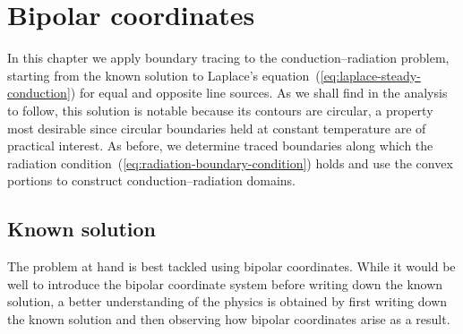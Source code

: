 \chapter{Bipolar coordinates}
\label{ch:bipolar}

In this chapter
we apply boundary tracing to the conduction--radiation problem,
starting from the known solution
to Laplace's equation~(\ref{eq:laplace-steady-conduction})
for equal and opposite line sources.
As we shall find in the analysis to follow,
this solution is notable because its contours are circular,
a property most desirable
since circular boundaries held at constant temperature
are of practical interest.
As before,
we determine traced boundaries along which
the radiation condition~(\ref{eq:radiation-boundary-condition}) holds
and use the convex portions to construct conduction--radiation domains.

\section{Known solution}
\label{sec:bipolar.known}

The problem at hand is best tackled using bipolar coordinates.
While it would be well to introduce the bipolar coordinate system
before writing down the known solution,
a better understanding of the physics is obtained
by first writing down the known solution
and then observing how bipolar coordinates arise as a result.

